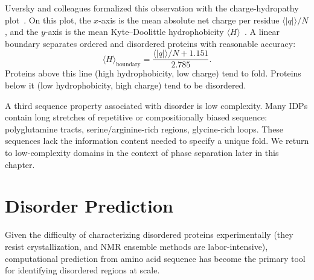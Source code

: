 Uversky and colleagues formalized this observation with the charge-hydropathy
plot~\cite{uversky2000}.  On this plot, the $x$-axis is the mean absolute net charge per
residue $\langle |q| \rangle / N$, and the $y$-axis is the mean Kyte--Doolittle
hydrophobicity $\langle H \rangle$~\cite{kyte1982}.  A linear boundary separates ordered and disordered
proteins with reasonable accuracy:
%
\begin{equation}
  \langle H \rangle_{\text{boundary}}
    = \frac{\langle |q| \rangle / N + 1.151}{2.785}.
  \label{eq:uversky-boundary}
\end{equation}
%
\noindent Proteins above this line (high hydrophobicity, low charge) tend to fold.  Proteins
below it (low hydrophobicity, high charge) tend to be
disordered.

A third sequence property associated with disorder is low complexity.  Many IDPs contain
long stretches of repetitive or compositionally biased sequence: polyglutamine tracts,
serine/arginine-rich regions, glycine-rich loops.  These sequences lack the information
content needed to specify a unique fold.  We return to low-complexity domains in the context
of phase separation later in this chapter.


\section{Disorder Prediction}
\label{sec:disorder-prediction}

Given the difficulty of characterizing disordered proteins experimentally (they resist
crystallization, and NMR ensemble methods are labor-intensive), computational prediction
from amino acid sequence has become the primary tool for identifying disordered regions at
scale.

